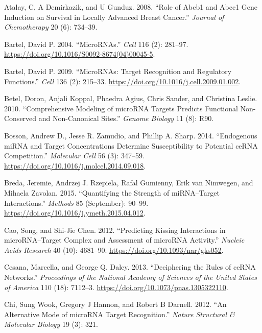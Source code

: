 \documentclass[a4,center,fleqn]{NAR}
\begin{document}
\leavevmode\hypertarget{ref-atalay2008role}{}%
Atalay, C, A Demirkazik, and U Gunduz. 2008. ``Role of Abcb1 and Abcc1
Gene Induction on Survival in Locally Advanced Breast Cancer.''
\emph{Journal of Chemotherapy} 20 (6): 734--39.

\leavevmode\hypertarget{ref-bartel_micrornas_2004}{}%
Bartel, David P. 2004. ``MicroRNAs.'' \emph{Cell} 116 (2): 281--97.
\url{https://doi.org/10.1016/S0092-8674(04)00045-5}.

\leavevmode\hypertarget{ref-bartel_micrornas:_2009}{}%
Bartel, David P. 2009. ``MicroRNAs: Target Recognition and Regulatory
Functions.'' \emph{Cell} 136 (2): 215--33.
\url{https://doi.org/10.1016/j.cell.2009.01.002}.

\leavevmode\hypertarget{ref-betel2010comprehensive}{}%
Betel, Doron, Anjali Koppal, Phaedra Agius, Chris Sander, and Christina
Leslie. 2010. ``Comprehensive Modeling of microRNA Targets Predicts
Functional Non-Conserved and Non-Canonical Sites.'' \emph{Genome
Biology} 11 (8): R90.

\leavevmode\hypertarget{ref-bosson_endogenous_2014}{}%
Bosson, Andrew D., Jesse R. Zamudio, and Phillip A. Sharp. 2014.
``Endogenous miRNA and Target Concentrations Determine Susceptibility to
Potential ceRNA Competition.'' \emph{Molecular Cell} 56 (3): 347--59.
\url{https://doi.org/10.1016/j.molcel.2014.09.018}.

\leavevmode\hypertarget{ref-breda_quantifying_2015}{}%
Breda, Jeremie, Andrzej J. Rzepiela, Rafal Gumienny, Erik van Nimwegen,
and Mihaela Zavolan. 2015. ``Quantifying the Strength of miRNA--Target
Interactions.'' \emph{Methods} 85 (September): 90--99.
\url{https://doi.org/10.1016/j.ymeth.2015.04.012}.

\leavevmode\hypertarget{ref-cao_predicting_2012}{}%
Cao, Song, and Shi-Jie Chen. 2012. ``Predicting Kissing Interactions in
microRNA--Target Complex and Assessment of microRNA Activity.''
\emph{Nucleic Acids Research} 40 (10): 4681--90.
\url{https://doi.org/10.1093/nar/gks052}.

\leavevmode\hypertarget{ref-cesana_deciphering_2013}{}%
Cesana, Marcella, and George Q. Daley. 2013. ``Deciphering the Rules of
ceRNA Networks.'' \emph{Proceedings of the National Academy of Sciences
of the United States of America} 110 (18): 7112--3.
\url{https://doi.org/10.1073/pnas.1305322110}.

\leavevmode\hypertarget{ref-chi2012alternative}{}%
Chi, Sung Wook, Gregory J Hannon, and Robert B Darnell. 2012. ``An
Alternative Mode of microRNA Target Recognition.'' \emph{Nature
Structural \& Molecular Biology} 19 (3): 321.
\end{document}
